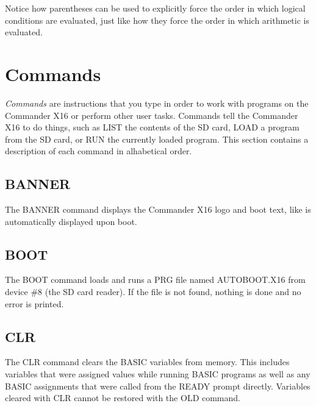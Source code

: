 
Notice how parentheses can be used to explicitly force the order in which
logical conditions are evaluated, just like how they force the order in which
arithmetic is evaluated.\\

\section{Commands}

\emph{Commands} are instructions that you type in order to work with programs
on the Commander X16 or perform other user tasks.  Commands tell the Commander
X16 to do things, such as {\ttfamily LIST} the contents of the SD card,
{\ttfamily LOAD} a program from the SD card, or {\ttfamily RUN} the currently
loaded program.  This section contains a description of each command in
alhabetical order.\\

\subsection{BANNER}

The {\ttfamily BANNER} command displays the Commander X16 logo and boot text,
like is automatically displayed upon boot.

\subsection{BOOT}

The {\ttfamily BOOT} command loads and runs a PRG file named {\ttfamily
AUTOBOOT.X16} from device \#8 (the SD card reader). If the file is not found,
nothing is done and no error is printed.\\

\subsection{CLR}

The {\ttfamily CLR} command clears the BASIC variables from memory.  This
includes variables that were assigned values while running BASIC programs as
well as any BASIC assignments that were called from the {\ttfamily READY}
prompt directly.  Variables cleared with {\ttfamily CLR} cannot be restored
with the {\ttfamily OLD} command.

